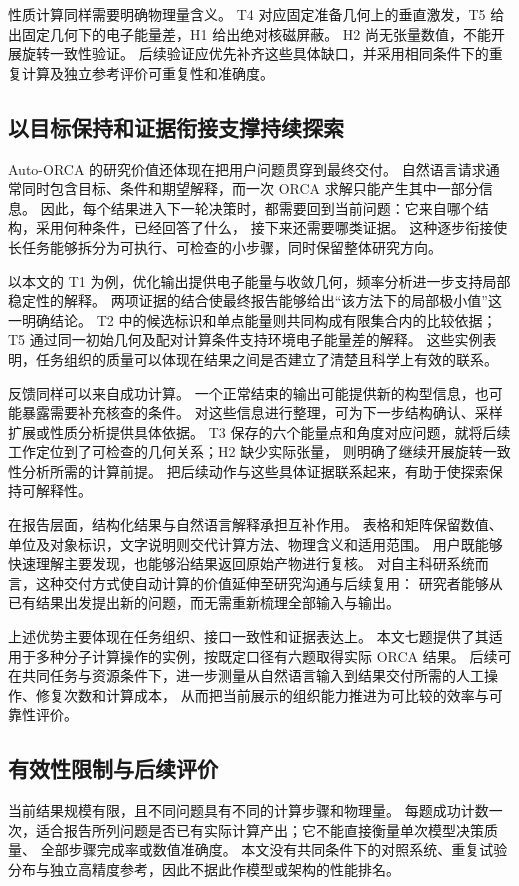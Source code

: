 \documentclass[UTF8,fontset=fandol,a4paper,11pt]{ctexart}
\begin{document}
性质计算同样需要明确物理量含义。%
T4 对应固定准备几何上的垂直激发，T5 给出固定几何下的电子能量差，H1 给出绝对核磁屏蔽。%
H2 尚无张量数值，不能开展旋转一致性验证。%
后续验证应优先补齐这些具体缺口，并采用相同条件下的重复计算及独立参考评价可重复性和准确度。

\subsection{以目标保持和证据衔接支撑持续探索}
Auto-ORCA 的研究价值还体现在把用户问题贯穿到最终交付。%
自然语言请求通常同时包含目标、条件和期望解释，而一次 ORCA 求解只能产生其中一部分信息。%
因此，每个结果进入下一轮决策时，都需要回到当前问题：它来自哪个结构，采用何种条件，已经回答了什么，%
接下来还需要哪类证据。%
这种逐步衔接使长任务能够拆分为可执行、可检查的小步骤，同时保留整体研究方向。

以本文的 T1 为例，优化输出提供电子能量与收敛几何，频率分析进一步支持局部稳定性的解释。%
两项证据的结合使最终报告能够给出“该方法下的局部极小值”这一明确结论。%
T2 中的候选标识和单点能量则共同构成有限集合内的比较依据；%
T5 通过同一初始几何及配对计算条件支持环境电子能量差的解释。%
这些实例表明，任务组织的质量可以体现在结果之间是否建立了清楚且科学上有效的联系。

反馈同样可以来自成功计算。%
一个正常结束的输出可能提供新的构型信息，也可能暴露需要补充核查的条件。%
对这些信息进行整理，可为下一步结构确认、采样扩展或性质分析提供具体依据。%
T3 保存的六个能量点和角度对应问题，就将后续工作定位到了可检查的几何关系；H2 缺少实际张量，%
则明确了继续开展旋转一致性分析所需的计算前提。%
把后续动作与这些具体证据联系起来，有助于使探索保持可解释性。

在报告层面，结构化结果与自然语言解释承担互补作用。%
表格和矩阵保留数值、单位及对象标识，文字说明则交代计算方法、物理含义和适用范围。%
用户既能够快速理解主要发现，也能够沿结果返回原始产物进行复核。%
对自主科研系统而言，这种交付方式使自动计算的价值延伸至研究沟通与后续复用：%
研究者能够从已有结果出发提出新的问题，而无需重新梳理全部输入与输出。

上述优势主要体现在任务组织、接口一致性和证据表达上。%
本文七题提供了其适用于多种分子计算操作的实例，按既定口径有六题取得实际 ORCA 结果。%
后续可在共同任务与资源条件下，进一步测量从自然语言输入到结果交付所需的人工操作、修复次数和计算成本，%
从而把当前展示的组织能力推进为可比较的效率与可靠性评价。

\subsection{有效性限制与后续评价}
当前结果规模有限，且不同问题具有不同的计算步骤和物理量。%
每题成功计数一次，适合报告所列问题是否已有实际计算产出；它不能直接衡量单次模型决策质量、%
全部步骤完成率或数值准确度。%
本文没有共同条件下的对照系统、重复试验分布与独立高精度参考，因此不据此作模型或架构的性能排名。
\end{document}
